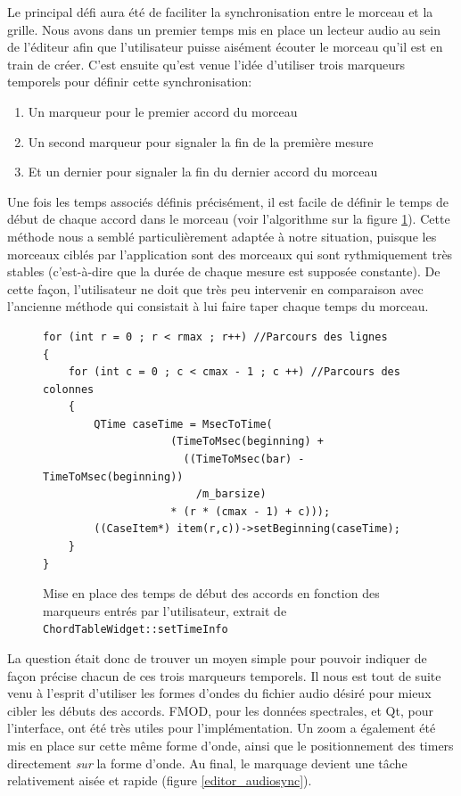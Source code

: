 \documentclass[a4paper,11pt]{article}
\begin{document}
Le principal défi aura été de faciliter la synchronisation entre le morceau et la grille. Nous avons dans un premier temps mis en place un lecteur audio au sein de l'éditeur afin que l'utilisateur puisse aisément écouter le morceau qu'il est en train de créer. C'est ensuite qu'est venue l'idée d'utiliser trois marqueurs temporels pour définir cette synchronisation:
\begin{enumerate}
 \item Un marqueur pour le premier accord du morceau
 \item Un second marqueur pour signaler la fin de la première mesure
 \item Et un dernier pour signaler la fin du dernier accord du morceau
\end{enumerate}
Une fois les temps associés définis précisément, il est facile de définir le temps de début de chaque accord dans le morceau (voir l'algorithme sur la figure \ref{editor_time_caseitems}). Cette méthode nous a semblé particulièrement adaptée à notre situation, puisque les morceaux ciblés par l'application sont des morceaux qui sont rythmiquement très stables (c'est-à-dire que la durée de chaque mesure est supposée constante). De cette façon, l'utilisateur ne doit que très peu intervenir en comparaison avec l'ancienne méthode qui consistait à lui faire taper chaque temps du morceau.

\begin{figure}[H]
\begin{lstlisting}
for (int r = 0 ; r < rmax ; r++) //Parcours des lignes
{
	for (int c = 0 ; c < cmax - 1 ; c ++) //Parcours des colonnes
	{
		QTime caseTime = MsecToTime(
				    (TimeToMsec(beginning) +
				      ((TimeToMsec(bar) - TimeToMsec(beginning))
				        /m_barsize)
				    * (r * (cmax - 1) + c)));
		((CaseItem*) item(r,c))->setBeginning(caseTime);
	}
}
\end{lstlisting}
\caption{Mise en place des temps de début des accords en fonction des marqueurs entrés par l'utilisateur, extrait de \texttt{ChordTableWidget::setTimeInfo}}
\label{editor_time_caseitems}
\end{figure}

La question était donc de trouver un moyen simple pour pouvoir indiquer de façon précise chacun de ces trois marqueurs temporels. Il nous est tout de suite venu à l'esprit d'utiliser les formes d'ondes du fichier audio désiré pour mieux cibler les débuts des accords. FMOD, pour les données spectrales, et Qt, pour l'interface, ont été très utiles pour l'implémentation. Un zoom a également été mis en place sur cette même forme d'onde, ainsi que le positionnement des timers directement \textit{sur} la forme d'onde. Au final, le marquage devient une tâche relativement aisée et rapide (figure \ref{editor_audiosync}).
\end{document}
